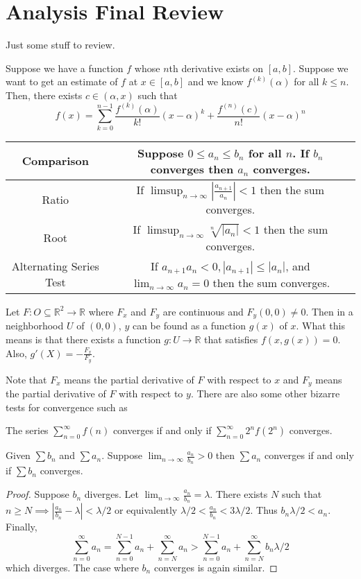 \documentclass{article}
\newcommand{\R}{\mathbb{R}}
\newcommand{\ra}[1][]{\xrightarrow{#1}}
\begin{document}
\section{Analysis Final Review}
Just some stuff to review.
\begin{theorem}
  Suppose we have a function $f$ whose $n$th derivative exists on $[a,b]$. Suppose we want to get an estimate of $f$ at $x\in[a,b]$ and we know $f^{(k)}(\alpha)$ for all $k\leq n$. Then, there exists $c\in(\alpha,x)$ such that
  $$f(x)=\sum_{k=0}^{n-1}\frac{f^{(k)}(\alpha)}{k!}(x-\alpha)^k+\frac{f^{(n)}(c)}{n!}(x-\alpha)^n$$
\end{theorem}
\begin{tabular}{|c|c|}
\hline
Comparison & Suppose $0\leq a_n\leq b_n$ for all $n$. If $b_n$ converges then $a_n$ converges. \\
\hline
Ratio & If $\limsup_{n\ra\infty}|\frac{a_{n+1}}{a_n}|<1$ then the sum converges.\\
\hline
Root & If $\limsup_{n\ra\infty}\sqrt[n]{|a_n|}<1$ then the sum converges.\\
\hline
Alternating Series Test & If $a_{n+1}a_n<0,|a_{n+1}|\leq|a_n|$, and $\lim_{n\ra\infty}a_n=0$ then the sum converges. \\
\hline
\end{tabular}
\begin{theorem}
Let $F:O\subseteq \R^2\ra\R$ where $F_x$ and $F_y$ are continuous and $F_y(0,0)\neq 0$. Then in a neighborhood $U$ of $(0,0)$, $y$ can be found as a function $g(x)$ of $x$. What this means is that there exists a function $g:U\ra \R$ that satisfies $f(x,g(x))=0$. Also, $g'(X)=-\frac{F_x}{F_y}$.
\end{theorem}
Note that $F_x$ means the partial derivative of $F$ with respect to $x$ and $F_y$ means the partial derivative of $F$ with respect to $y$. There are also some other bizarre tests for convergence such as
\begin{theorem}
  The series $\sum_{n=0}^\infty f(n)$ converges if and only if $\sum_{n=0}^\infty 2^nf(2^n)$ converges.
\end{theorem}
\begin{theorem}
  Given $\sum b_n$ and $\sum a_n$. Suppose $\lim_{n\to\infty}\frac{a_n}{b_n}>0$ then $\sum a_n$ converges if and only if $\sum b_n$ converges.
\end{theorem}
\begin{proof}
  Suppose $b_n$ diverges. Let $\lim_{n\to\infty}\frac{a_n}{b_n}=\lambda$. There exists $N$ such that $n\geq N\implies |\frac{a_n}{b_n}-\lambda|<\lambda/2$ or equivalently $\lambda/2<\frac{a_n}{b_n}<3\lambda/2$. Thus $b_n\lambda/2<a_n$. Finally,
  $$\sum_{n=0}^\infty a_n=\sum_{n=0}^{N-1}a_n+\sum_{n=N}^\infty a_n>\sum_{n=0}^{N-1}a_n+\sum_{n=N}^\infty b_n\lambda/2$$ which diverges. The case where $b_n$ converges is again similar.
\end{proof}
\end{document}
